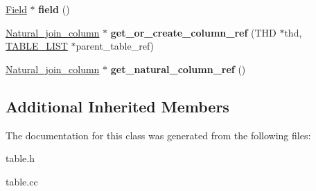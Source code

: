 \begin{DoxyCompactItemize}
\mbox{\hyperlink{classField}{Field}} $\ast$ {\bfseries field} ()
\item 
\mbox{\label{classField__iterator__table__ref_a1223fd2ce9b40cae677a4f64fa49bda9}} 
\mbox{\hyperlink{classNatural__join__column}{Natural\+\_\+join\+\_\+column}} $\ast$ {\bfseries get\+\_\+or\+\_\+create\+\_\+column\+\_\+ref} (T\+HD $\ast$thd, \mbox{\hyperlink{structTABLE__LIST}{T\+A\+B\+L\+E\+\_\+\+L\+I\+ST}} $\ast$parent\+\_\+table\+\_\+ref)
\item 
\mbox{\label{classField__iterator__table__ref_abf2d9f7dcd4d1136f9a1fb02d9217104}} 
\mbox{\hyperlink{classNatural__join__column}{Natural\+\_\+join\+\_\+column}} $\ast$ {\bfseries get\+\_\+natural\+\_\+column\+\_\+ref} ()
\end{DoxyCompactItemize}
\subsection*{Additional Inherited Members}


The documentation for this class was generated from the following files\+:\begin{DoxyCompactItemize}
\item 
table.\+h\item 
table.\+cc\end{DoxyCompactItemize}
